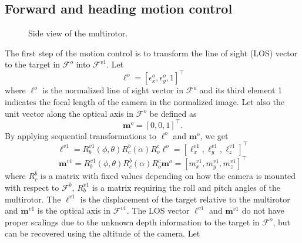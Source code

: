 \subsection{Forward and heading motion control}
\begin{figure}[thpb]
	\centering
	\caption{Side view of the multirotor.}
	\label{side_view}
\end{figure}
The first step of the motion control is to transform the line of sight (LOS) vector to the target in $\mathcal{F}^o$ into $\mathcal{F}^{v1}$. Let 
\begin{equation}
\mathbf{\ell}^o=[\epsilon_x^o, \epsilon_y^o, 1]^\top
\end{equation} where $\ell^o$ is the normalized line of sight vector in $\mathcal{F}^o$ and its third element 1 indicates the focal length of the camera in the normalized image. Let also the unit vector along the optical axis in $\mathcal{F}^o$ be defined as 
\begin{equation}
\mathbf{m}^o=[0, 0, 1]^\top.
\end{equation}
By applying sequential transformations to $\ell^o$ and $\mathbf{m}^o$, we get
\begin{equation}
\mathbf{\ell}^{v1}=R^{v1}_b(\phi,\theta)R^b_c(\alpha)R^c_o\ell^o=[\ell^{v1}_x, \ell^{v1}_y, \ell^{v1}_z]^\top
\end{equation}
\begin{equation}
\mathbf{m}^{v1}=R^{v1}_b(\phi,\theta)R^b_c(\alpha)R^c_o\mathbf{m}^o=[m^{v1}_x, m^{v1}_y, m^{v1}_z]^\top
\end{equation} where $R^b_c$ is a matrix with fixed values depending on how the camera is mounted with respect to $\mathcal{F}^b$, $R^{v1}_b$ is a matrix requiring the roll and pitch angles of the multirotor. The $\ell^{v1}$ is the displacement of the target relative to the multirotor and $\mathbf{m}^{v1}$ is the optical axis in $\mathcal{F}^{v1}$. The LOS vector $\ell^{v1}$ and $\mathbf{m}^{v1}$ do not have proper scalings due to the unknown depth information to the target in $\mathcal{F}^o$, but can be recovered using the altitude of the camera. Let
